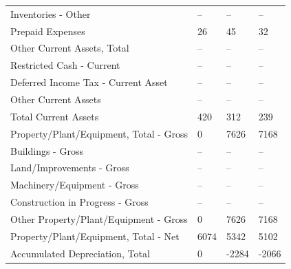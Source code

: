 \documentclass[grad,numbers]{coppe}
\begin{document}
\begin{longtable}[t]{llll}
  \hspace{1em}\hspace{1em}Inventories - Other & -- & -- & --\\
  \hspace{1em}Prepaid Expenses & 26 & 45 & 32\\
  \hspace{1em}Other Current Assets, Total & -- & -- & --\\
  \hspace{1em}\hspace{1em}Restricted Cash - Current & -- & -- & --\\
  \hspace{1em}\hspace{1em}Deferred Income Tax - Current Asset & -- & -- & --\\
  \hspace{1em}\hspace{1em}Other Current Assets & -- & -- & --\\
  \hspace{1em}Total Current Assets & 420 & 312 & 239\\
  \hspace{1em}Property/Plant/Equipment, Total - Gross & 0 & 7626 & 7168\\
  \hspace{1em}\hspace{1em}Buildings - Gross & -- & -- & --\\
  \hspace{1em}\hspace{1em}Land/Improvements - Gross & -- & -- & --\\
  \hspace{1em}\hspace{1em}Machinery/Equipment - Gross & -- & -- & --\\
  \hspace{1em}\hspace{1em}Construction in Progress - Gross & -- & -- & --\\
  \hspace{1em}\hspace{1em}Other Property/Plant/Equipment - Gross & 0 & 7626 & 7168\\
  \hspace{1em}Property/Plant/Equipment, Total - Net & 6074 & 5342 & 5102\\
  \hspace{1em}\hspace{1em}Accumulated Depreciation, Total & 0 & -2284 & -2066\\

\end{longtable}
\end{document}
